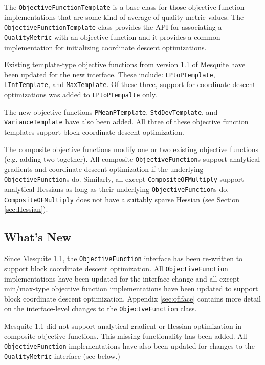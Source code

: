 \documentclass{article}
\begin{document}
The \texttt{ObjectiveFunctionTemplate} is a base class for those objective function implementations that are some kind of average of quality metric values.  The \texttt{ObjectiveFunctionTemplate} class provides the API for associating a \texttt{QualityMetric} with an objective function and it provides a common implementation for initializing coordinate descent optimizations.

Existing template-type objective functions from version 1.1 of Mesquite have been updated for the new interface.  These include: \texttt{LPtoPTemplate}, \texttt{LInfTemplate}, and \texttt{MaxTemplate}.  Of these three, support for coordinate descent optimizations was added to \texttt{LPtoPTempalte} only.

The new objective functions \texttt{PMeanPTemplate}, \texttt{StdDevTemplate}, and \texttt{VarianceTemplate} have also been added.  All three of these objective function templates support block coordinate descent optimization.

The composite objective functions modify one or two existing objective functions (e.g. adding two together).  All composite \texttt{ObjectiveFunction}s support analytical gradients and coordinate descent optimization if the underlying \texttt{ObjectiveFunction}s do.  Similarly, all except \texttt{CompositeOFMultiply} support analytical Hessians as long as their underlying \texttt{ObjectiveFunction}s do.  \texttt{CompositeOFMultiply} does not have a suitably sparse Hessian (see Section \ref{sec:Hessian}).

\subsection{What's New}

Since Mesquite 1.1, the \texttt{ObjectiveFunction} interface has been re-written to support block coordinate descent optimization.  All \texttt{ObjectiveFunction} implementations have been updated for the interface change and all except min/max-type objective function implementations have been updated to support block coordinate descent optimization.  Appendix \ref{sec:ofiface} contains more detail on the interface-level changes to the \texttt{ObjectveFunction} class.

Mesquite 1.1 did not support analytical gradient or Hessian optimization in composite objective functions.  This missing functionality has been added.  All \texttt{ObjectiveFunction} implementations have also been updated for changes to the \texttt{QualityMetric} interface (see below.)
\end{document}

